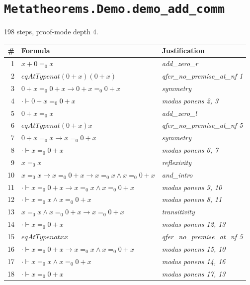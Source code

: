 \section*{\texttt{Metatheorems.Demo.demo\_add\_comm}}
198 steps, proof-mode depth 4.

\begin{longtable}{r l l}
\hline
\# & Formula & Justification \\
\hline
\endhead
1 & $x  +  0  =_0  x$ & \textit{add\_zero\_r} \\
2 & $eqAtType nat (0  +  x) (0  +  x)$ & \textit{qfer\_no\_premise\_at\_nf 1} \\
3 & $0  +  x  =_0  0  +  x  \to  0  +  x  =_0  0  +  x$ & \textit{symmetry} \\
4 & $\cdot  \vdash  0  +  x  =_0  0  +  x$ & \textit{modus ponens 2, 3} \\
5 & $0  +  x  =_0  x$ & \textit{add\_zero\_l} \\
6 & $eqAtType nat (0  +  x) x$ & \textit{qfer\_no\_premise\_at\_nf 5} \\
7 & $0  +  x  =_0  x  \to  x  =_0  0  +  x$ & \textit{symmetry} \\
8 & $\cdot  \vdash  x  =_0  0  +  x$ & \textit{modus ponens 6, 7} \\
9 & $x  =_0  x$ & \textit{reflexivity} \\
10 & $x  =_0  x  \to  x  =_0  0  +  x  \to  x  =_0  x  \land  x  =_0  0  +  x$ & \textit{and\_intro} \\
11 & $\cdot  \vdash  x  =_0  0  +  x  \to  x  =_0  x  \land  x  =_0  0  +  x$ & \textit{modus ponens 9, 10} \\
12 & $\cdot  \vdash  x  =_0  x  \land  x  =_0  0  +  x$ & \textit{modus ponens 8, 11} \\
13 & $x  =_0  x  \land  x  =_0  0  +  x  \to  x  =_0  0  +  x$ & \textit{transitivity} \\
14 & $\cdot  \vdash  x  =_0  0  +  x$ & \textit{modus ponens 12, 13} \\
15 & $eqAtType nat x x$ & \textit{qfer\_no\_premise\_at\_nf 5} \\
16 & $\cdot  \vdash  x  =_0  0  +  x  \to  x  =_0  x  \land  x  =_0  0  +  x$ & \textit{modus ponens 15, 10} \\
17 & $\cdot  \vdash  x  =_0  x  \land  x  =_0  0  +  x$ & \textit{modus ponens 14, 16} \\
18 & $\cdot  \vdash  x  =_0  0  +  x$ & \textit{modus ponens 17, 13} \\

\end{longtable}
